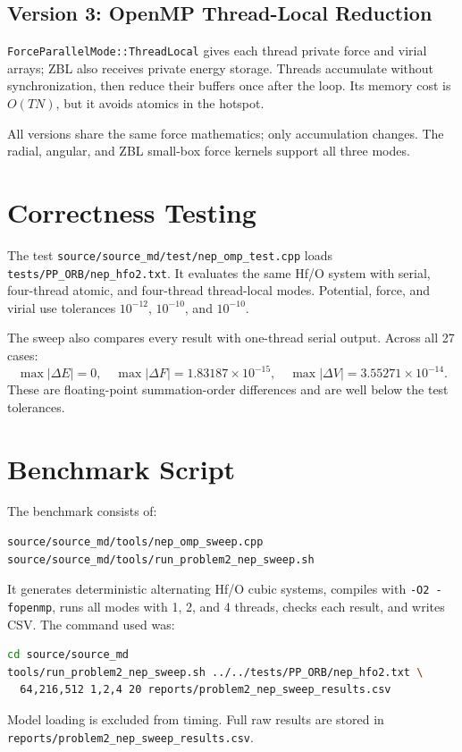 \documentclass[11pt]{article}
\begin{document}
\subsection{Version 3: OpenMP Thread-Local Reduction}
\texttt{ForceParallelMode::ThreadLocal} gives each thread private force and
virial arrays; ZBL also receives private energy storage. Threads accumulate
without synchronization, then reduce their buffers once after the loop. Its
memory cost is $O(TN)$, but it avoids atomics in the hotspot.

All versions share the same force mathematics; only accumulation changes. The
radial, angular, and ZBL small-box force kernels support all three modes.

\section{Correctness Testing}
The test \texttt{source/source\_md/test/nep\_omp\_test.cpp} loads
\texttt{tests/PP\_ORB/nep\_hfo2.txt}. It evaluates the same Hf/O system with
serial, four-thread atomic, and four-thread thread-local modes. Potential,
force, and virial use tolerances $10^{-12}$, $10^{-10}$, and $10^{-10}$.

The sweep also compares every result with one-thread serial output. Across all
27 cases:
\[
\max|\Delta E|=0,\quad
\max|\Delta F|=1.83187\times10^{-15},\quad
\max|\Delta V|=3.55271\times10^{-14}.
\]
These are floating-point summation-order differences and are well below the
test tolerances.

\section{Benchmark Script}
The benchmark consists of:
\begin{lstlisting}
source/source_md/tools/nep_omp_sweep.cpp
source/source_md/tools/run_problem2_nep_sweep.sh
\end{lstlisting}
It generates deterministic alternating Hf/O cubic systems, compiles with
\texttt{-O2 -fopenmp}, runs all modes with 1, 2, and 4 threads, checks each
result, and writes CSV. The command used was:
\begin{lstlisting}[language=bash]
cd source/source_md
tools/run_problem2_nep_sweep.sh ../../tests/PP_ORB/nep_hfo2.txt \
  64,216,512 1,2,4 20 reports/problem2_nep_sweep_results.csv
\end{lstlisting}
Model loading is excluded from timing. Full raw results are stored in
\texttt{reports/problem2\_nep\_sweep\_results.csv}.
\end{document}
